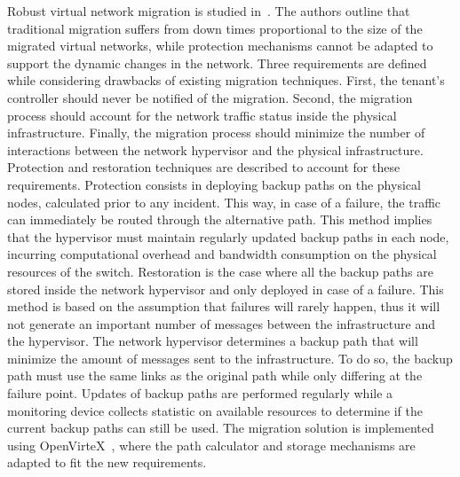 Robust virtual network migration is studied in~\cite{Ko2017c}. The authors outline that traditional migration suffers from down times proportional to the size of the migrated virtual networks, while protection mechanisms cannot be adapted to support the dynamic changes in the network.
Three requirements are defined while considering drawbacks of existing migration techniques. 
First, the tenant's controller should never be notified of the migration.
Second, the migration process should account for the network traffic status inside the physical infrastructure.
Finally, the migration process should minimize the number of interactions between the network hypervisor and the physical infrastructure.
Protection and restoration techniques are described to account for these requirements.
Protection consists in deploying backup paths on the physical nodes, calculated prior to any incident.
This way, in case of a failure, the traffic can immediately be routed through the alternative path. 
This method implies that the hypervisor must maintain regularly updated backup paths in each node, incurring computational overhead and bandwidth consumption on the physical resources of the switch.
Restoration is the case where all the backup paths are stored inside the network hypervisor and only deployed in case of a failure.
This method is based on the assumption that failures will rarely happen, thus it will not generate an important number of messages between the infrastructure and the hypervisor.
The network hypervisor determines a backup path that will minimize the amount of messages sent to the infrastructure.
To do so, the backup path must use the same links as the original path while only differing at the failure point.
Updates of backup paths are performed regularly while a monitoring device collects statistic on available resources to determine if the current backup paths can still be used.
The migration solution is implemented using OpenVirteX~\cite{OpenVirteX-Al-Shabibi2014}, where the path calculator and storage mechanisms are adapted to fit the new requirements. 

